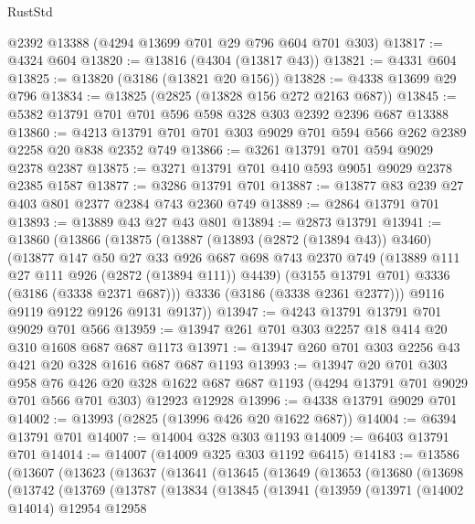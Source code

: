 \begin{lexlean}{RustStd}
\begin{coremodule}
    @2392
    @13388
    (@4294 @13699 @701 @29 @796 @604 @701 @303)
@13817 := @4324 @604
@13820 := @13816 (@4304 (@13817 @43))
@13821 := @4331 @604
@13825 := @13820 (@3186 (@13821 @20 @156))
@13828 := @4338 @13699 @29 @796
@13834 := @13825 (@2825 (@13828 @156 @272 @2163 @687))
@13845 := @5382 @13791 @701 @701 @596 @598 @328 @303 @2392 @2396 @687 @13388
@13860 := @4213 @13791 @701 @701 @303 @9029 @701 @594 @566 @262 @2389 @2258 @20 @838 @2352 @749
@13866 := @3261 @13791 @701 @594 @9029 @2378 @2387
@13875 := @3271 @13791 @701 @410 @593 @9051 @9029 @2378 @2385 @1587
@13877 := @3286 @13791 @701
@13887 := @13877 @83 @239 @27 @403 @801 @2377 @2384 @743 @2360 @749
@13889 := @2864 @13791 @701
@13893 := @13889 @43 @27 @43 @801
@13894 := @2873 @13791
@13941 := @13860
    (@13866
      (@13875
        (@13887
          (@13893 (@2872 (@13894 @43)) @3460)
          (@13877
            @147
            @50
            @27
            @33
            @926
            @687
            @698
            @743
            @2370
            @749
            (@13889 @111 @27 @111 @926 (@2872 (@13894 @111)) @4439)
            (@3155 @13791 @701)
            @3336
            (@3186 (@3338 @2371 @687)))
          @3336
          (@3186 (@3338 @2361 @2377)))
        @9116
        @9119
        @9122
        @9126
        @9131
        @9137))
@13947 := @4243 @13791 @13791 @701 @9029 @701 @566
@13959 := @13947 @261 @701 @303 @2257 @18 @414 @20 @310 @1608 @687 @687 @1173
@13971 := @13947 @260 @701 @303 @2256 @43 @421 @20 @328 @1616 @687 @687 @1193
@13993 := @13947
    @20
    @701
    @303
    @958
    @76
    @426
    @20
    @328
    @1622
    @687
    @687
    @1193
    (@4294 @13791 @701 @9029 @701 @566 @701 @303)
    @12923
    @12928
@13996 := @4338 @13791 @9029 @701
@14002 := @13993 (@2825 (@13996 @426 @20 @1622 @687))
@14004 := @6394 @13791 @701
@14007 := @14004 @328 @303 @1193
@14009 := @6403 @13791 @701
@14014 := @14007 (@14009 @325 @303 @1192 @6415)
@14183 := @13586
    (@13607
      (@13623
        (@13637
          (@13641
            (@13645
              (@13649
                (@13653
                  (@13680
                    (@13698
                      (@13742
                        (@13769
                          (@13787
                            (@13834
                              (@13845
                                (@13941
                                  (@13959
                                    (@13971
                                      (@14002 @14014)
                                      @12954
                                      @12958

\end{coremodule}
\end{lexlean}
